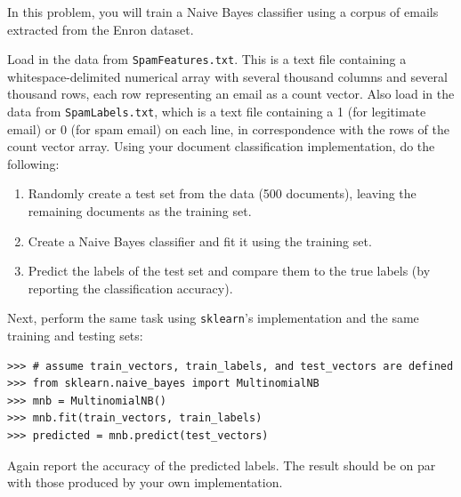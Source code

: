 \begin{problem}
In this problem, you will train a Naive Bayes classifier using a corpus of emails extracted from the Enron dataset.

Load in the data from {\tt SpamFeatures.txt}. This is a text file containing a whitespace-delimited
numerical array with several thousand columns and several thousand rows, each row representing an email
as a count vector.
Also load in the data from {\tt SpamLabels.txt}, which is a text file containing a 1 (for legitimate email) or 0
(for spam email) on each line, in correspondence with the rows of the count vector array.
Using your document classification implementation, do the following:
\begin{enumerate}
\item Randomly create a test set from the data (500 documents), leaving the remaining documents as the training set.
\item Create a Naive Bayes classifier and fit it using the training set.
\item Predict the labels of the test set and compare them to the true labels (by reporting the classification accuracy).
\end{enumerate}

Next, perform the same task using {\tt sklearn}'s implementation and the same training and testing sets:
\begin{lstlisting}
>>> # assume train_vectors, train_labels, and test_vectors are defined
>>> from sklearn.naive_bayes import MultinomialNB
>>> mnb = MultinomialNB()
>>> mnb.fit(train_vectors, train_labels)
>>> predicted = mnb.predict(test_vectors)
\end{lstlisting}
Again report the accuracy of the predicted labels. The result should be on par with those produced by your
own implementation.
\end{problem}


